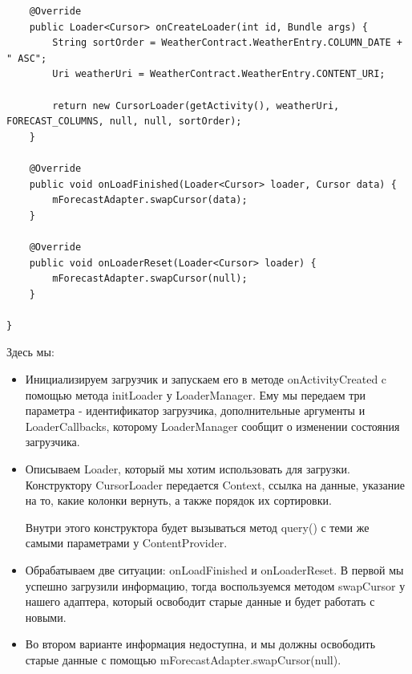 \documentclass[12 pt]{article}
\begin{document}
\begin{lstlisting}
    @Override
    public Loader<Cursor> onCreateLoader(int id, Bundle args) {
        String sortOrder = WeatherContract.WeatherEntry.COLUMN_DATE + " ASC";
        Uri weatherUri = WeatherContract.WeatherEntry.CONTENT_URI;

        return new CursorLoader(getActivity(), weatherUri, FORECAST_COLUMNS, null, null, sortOrder);
    }

    @Override
    public void onLoadFinished(Loader<Cursor> loader, Cursor data) {
        mForecastAdapter.swapCursor(data);
    }

    @Override
    public void onLoaderReset(Loader<Cursor> loader) {
        mForecastAdapter.swapCursor(null);
    }

}
    \end{lstlisting}
    Здесь мы:
\begin{itemize}
\item Инициализируем загрузчик и запускаем его в методе onActivityCreated c помощью метода initLoader у LoaderManager. Ему мы передаем три параметра - идентификатор загрузчика, дополнительные аргументы и LoaderCallbacks, которому LoaderManager сообщит о  изменении состояния загрузчика.
\item Описываем Loader, который мы хотим использовать для загрузки. Конструктору CursorLoader передается Context, ссылка на данные, указание на то, какие колонки вернуть, а также порядок их сортировки.

Внутри этого конструктора будет вызываться метод query() с теми же самыми параметрами у ContentProvider.
\item Обрабатываем две ситуации: onLoadFinished и onLoaderReset. В первой мы успешно загрузили информацию, тогда воспользуемся методом swapCursor у нашего адаптера, который освободит старые данные и будет работать с новыми.
\item Во втором варианте информация недоступна, и мы должны освободить старые данные с помощью mForecastAdapter.swapCursor(null).
\end{itemize}
 
\end{document}
